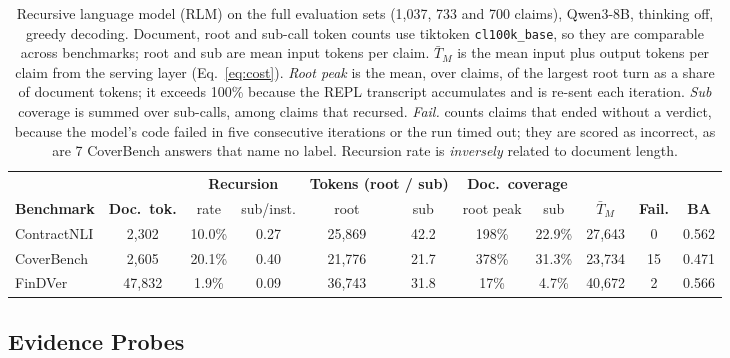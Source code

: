 \documentclass[11pt]{article}
\begin{document}
\begin{table}[H]
\centering
\footnotesize
\setlength{\tabcolsep}{4.5pt}
\begin{tabular}{lcccccccccc}
\toprule
& & \multicolumn{2}{c}{\textbf{Recursion}} & \multicolumn{2}{c}{\textbf{Tokens (root / sub)}} & \multicolumn{2}{c}{\textbf{Doc.\ coverage}} & & & \\
\cmidrule(lr){3-4}\cmidrule(lr){5-6}\cmidrule(lr){7-8}
\textbf{Benchmark} & \textbf{Doc.\ tok.} & rate & sub/inst. & root & sub & root peak & sub & $\bar{T}_M$ & \textbf{Fail.} & \textbf{BA} \\
\midrule
ContractNLI & 2{,}302 & 10.0\% & 0.27 & 25{,}869 & 42.2 & 198\% & 22.9\% & 27{,}643 & 0 & 0.562 \\
CoverBench & 2{,}605 & 20.1\% & 0.40 & 21{,}776 & 21.7 & 378\% & 31.3\% & 23{,}734 & 15 & 0.471 \\
FinDVer & 47{,}832 & 1.9\% & 0.09 & 36{,}743 & 31.8 & 17\% & 4.7\% & 40{,}672 & 2 & 0.566 \\
\bottomrule
\end{tabular}
\caption{Recursive language model (RLM) on the full evaluation sets
(1{,}037, 733 and 700 claims), Qwen3-8B, thinking off, greedy decoding.
Document, root and sub-call token counts use tiktoken
\texttt{cl100k\_base}, so they are comparable across benchmarks; root and
sub are mean input tokens per claim. $\bar{T}_M$ is the mean input plus
output tokens per claim from the serving layer (Eq.~\eqref{eq:cost}).
\emph{Root peak} is the mean, over claims, of the largest root turn as a
share of document tokens; it exceeds 100\% because the REPL transcript
accumulates and is re-sent each iteration. \emph{Sub} coverage is summed
over sub-calls, among claims that recursed. \emph{Fail.} counts claims
that ended without a verdict, because the model's code failed in five
consecutive iterations or the run timed out; they are scored as
incorrect, as are 7 CoverBench answers that name no label. Recursion
rate is \emph{inversely} related to document length.}
\label{tab:rlm_behaviour}
\end{table}

\subsection{Evidence Probes}
\end{document}
